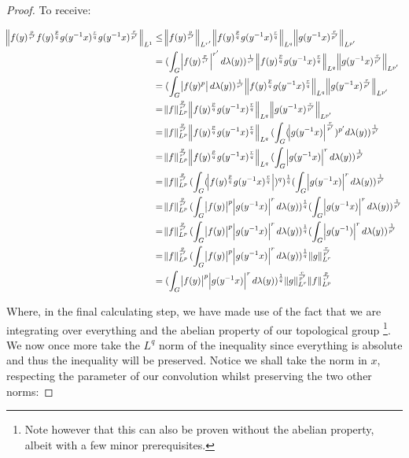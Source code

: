 \begin{proof}
To receive:

\begin{align*}
\norm{f(y)^\frac{p}{r'} f(y)^\frac{p}{q} g(y^{-1}x)^\frac{r}{q}g(y^{-1}x)^\frac{r}{p'}}_{L^1} &\leq \norm{f(y)^\frac{p}{r'}}_{L^{r'}} \norm{f(y)^\frac{p}{q} g(y^{-1}x)^\frac{r}{q}}_{L^q} \norm{g(y^{-1}x)^\frac{r}{p'}}_{L^{p'}} \\
&= (\int_G \abs{f(y)^\frac{p}{r'}}^{r'} d\lambda(y))^\frac{1}{r'} \norm{f(y)^\frac{p}{q} g(y^{-1}x)^\frac{r}{q}}_{L^q} \norm{g(y^{-1}x)^\frac{r}{p'}}_{L^{p'}} \\
&= (\int_G \abs{f(y)^p} d\lambda(y))^\frac{1}{r'} \norm{f(y)^\frac{p}{q} g(y^{-1}x)^\frac{r}{q}}_{L^q} \norm{g(y^{-1}x)^\frac{r}{p'}}_{L^{p'}} \\
&= \norm{f}^\frac{p}{r'}_{L^p} \norm{f(y)^\frac{p}{q} g(y^{-1}x)^\frac{r}{q}}_{L^q} \norm{g(y^{-1}x)^\frac{r}{p'}}_{L^{p'}} \\
&= \norm{f}^\frac{p}{r'}_{L^p} \norm{f(y)^\frac{p}{q} g(y^{-1}x)^\frac{r}{q}}_{L^q} (\int_G ( \abs{g(y^{-1}x)}^\frac{r}{p'})^{p'} d\lambda(y) )^\frac{1}{p'} \\
&= \norm{f}^\frac{p}{r'}_{L^p} \norm{f(y)^\frac{p}{q} g(y^{-1}x)^\frac{r}{q}}_{L^q} (\int_G  \abs{g(y^{-1}x)}^r d\lambda(y) )^\frac{1}{p'} \\
&= \norm{f}^\frac{p}{r'}_{L^p} (\int_G (\abs{f(y)^\frac{p}{q} g(y^{-1}x)^\frac{r}{q}} )^q)^\frac{1}{q} (\int_G  \abs{g(y^{-1}x)}^r d\lambda(y) )^\frac{1}{p'} \\
&= \norm{f}^\frac{p}{r'}_{L^p} (\int_G \abs{f(y)}^p\abs{g(y^{-1}x)}^r d\lambda(y) )^\frac{1}{q} (\int_G \abs{g(y^{-1}x)}^r d\lambda(y) )^\frac{1}{p'} \\
&= \norm{f}^\frac{p}{r'}_{L^p} (\int_G \abs{f(y)}^p\abs{g(y^{-1}x)}^r d\lambda(y) )^\frac{1}{q} (\int_G \abs{g(y^{-1})}^r d\lambda(y) )^\frac{1}{p'} \\
&= \norm{f}^\frac{p}{r'}_{L^p} (\int_G \abs{f(y)}^p\abs{g(y^{-1}x)}^r d\lambda(y) )^\frac{1}{q} \norm{g}^\frac{r}{p'}_{L^r} \\
&= (\int_G \abs{f(y)}^p\abs{g(y^{-1}x)}^r d\lambda(y) )^\frac{1}{q} \norm{g}^\frac{r}{p'}_{L^r} \norm{f}^\frac{p}{r'}_{L^p}
\end{align*}

Where, in the final calculating step, we have made use of the fact that we are integrating over everything and the abelian property of our topological group \footnote{Note however that this can also be proven without the abelian property, albeit with a few minor prerequisites.}.
We now once more take the $L^q$ norm of the inequality since everything is absolute and thus the inequality will be preserved. Notice we shall take the norm in $x$, respecting the parameter of our convolution whilst preserving the two other norms:


\end{proof}
